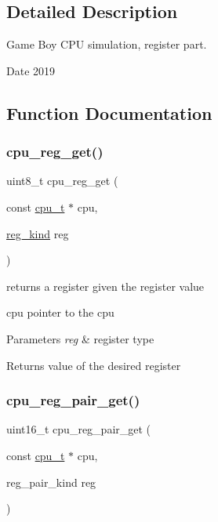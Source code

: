 \subsection{Detailed Description}
Game Boy C\+PU simulation, register part. 

\begin{DoxyDate}{Date}
2019 
\end{DoxyDate}


\subsection{Function Documentation}
\mbox{\label{cpu-registers_8c_abe62e977d253f7a6be79d0b5ca8f105f}} 
\subsubsection{\texorpdfstring{cpu\+\_\+reg\+\_\+get()}{cpu\_reg\_get()}}
{\footnotesize\ttfamily uint8\+\_\+t cpu\+\_\+reg\+\_\+get (\begin{DoxyParamCaption}\item[{const \hyperlink{structcpu__t}{cpu\+\_\+t} $\ast$}]{cpu,  }\item[{\hyperlink{cpu-registers_8h_ae7a73a08aaa7af3cfe957f32ef8af9d3}{reg\+\_\+kind}}]{reg }\end{DoxyParamCaption})}



returns a register given the register value 

cpu pointer to the cpu 
\begin{DoxyParams}{Parameters}
{\em reg} & register type\\
\hline
\end{DoxyParams}
\begin{DoxyReturn}{Returns}
value of the desired register 
\end{DoxyReturn}
\mbox{\label{cpu-registers_8c_a259712cddf80a16395900832af372953}} 
\subsubsection{\texorpdfstring{cpu\+\_\+reg\+\_\+pair\+\_\+get()}{cpu\_reg\_pair\_get()}}
{\footnotesize\ttfamily uint16\+\_\+t cpu\+\_\+reg\+\_\+pair\+\_\+get (\begin{DoxyParamCaption}\item[{const \hyperlink{structcpu__t}{cpu\+\_\+t} $\ast$}]{cpu,  }\item[{reg\+\_\+pair\+\_\+kind}]{reg }\end{DoxyParamCaption})}



